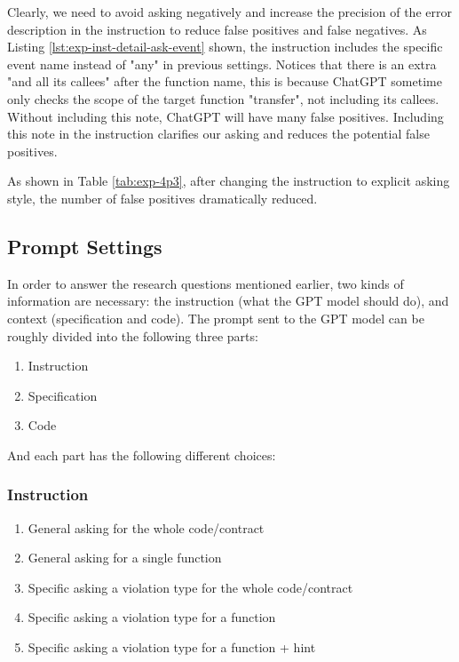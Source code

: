 {Clearly, we need to avoid asking negatively and increase the precision of the error description in the instruction to reduce false positives and false negatives. As Listing \ref{lst:exp-inst-detail-ask-event} shown, the instruction includes the specific event name instead of "any" in previous settings. Notices that there is an extra "and all its
callees" after the function name, this is because ChatGPT sometime only checks the scope of the target function "transfer", not including its callees. Without including this note, ChatGPT will have many false positives. Including this note in the instruction clarifies our asking and reduces the potential false positives.




As shown in Table \ref{tab:exp-4p3}, after changing the instruction to explicit asking style, the number of false positives dramatically reduced. 

 }


\subsection{Prompt Settings }
In order to answer the research questions mentioned earlier, two kinds of information are necessary: the instruction (what the GPT model should do), and context (specification and code).
The prompt sent to the GPT model can be roughly divided into the following three parts:
\begin{enumerate}
    \item Instruction
    \item Specification
    \item Code
\end{enumerate}

And each part has the following different choices:

\subsubsection{Instruction}
\begin{enumerate}
    \item General asking for the whole code/contract
    \item General asking for a single function
    \item Specific asking a violation type for the whole code/contract
    \item Specific asking a violation type for a function
    \item Specific asking a violation type for a function + hint 
\end{enumerate}
